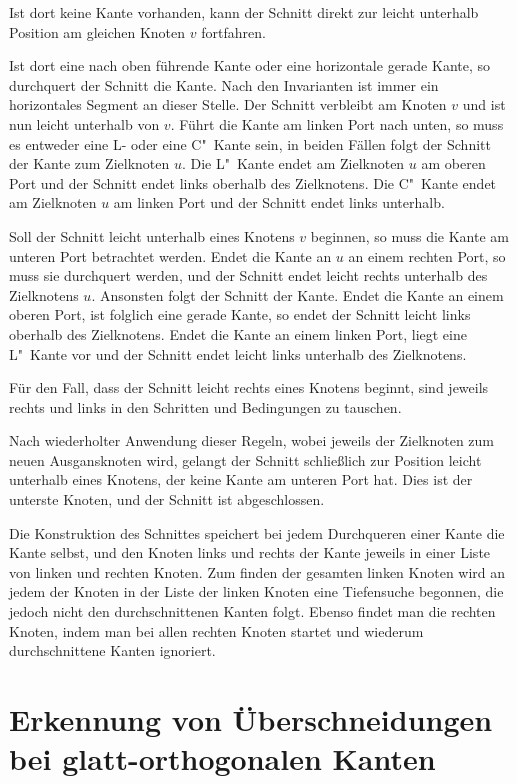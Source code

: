 \documentclass[a4paper]{scrreprt}
\theoremstyle{definition}
\begin{document}
Ist dort keine Kante vorhanden, kann der Schnitt direkt zur leicht unterhalb Position am gleichen Knoten $v$ fortfahren.

Ist dort eine nach oben führende Kante oder eine horizontale gerade Kante, so durchquert der Schnitt die Kante. Nach den Invarianten ist immer ein horizontales Segment an dieser Stelle. Der Schnitt verbleibt am Knoten $v$ und ist nun leicht unterhalb von $v$. Führt die Kante am linken Port nach unten, so muss es entweder eine L- oder eine C"~Kante sein, in beiden Fällen folgt der Schnitt der Kante zum Zielknoten $u$. Die L"~Kante endet am Zielknoten $u$ am oberen Port und der Schnitt endet links oberhalb des Zielknotens. Die C"~Kante endet am Zielknoten $u$ am linken Port und der Schnitt endet links unterhalb.

Soll der Schnitt leicht unterhalb eines Knotens $v$ beginnen, so muss die Kante am unteren Port betrachtet werden. Endet die Kante an $u$ an einem rechten Port, so muss sie durchquert werden, und der Schnitt endet leicht rechts unterhalb des Zielknotens $u$. Ansonsten folgt der Schnitt der Kante. Endet die Kante an einem oberen Port, ist folglich eine gerade Kante, so endet der Schnitt leicht links oberhalb des Zielknotens. Endet die Kante an einem linken Port, liegt eine L"~Kante vor und der Schnitt endet leicht links unterhalb des Zielknotens.

Für den Fall, dass der Schnitt leicht rechts eines Knotens beginnt, sind jeweils rechts und links in den Schritten und Bedingungen zu tauschen.

Nach wiederholter Anwendung dieser Regeln, wobei jeweils der Zielknoten zum neuen Ausgansknoten wird, gelangt der Schnitt schließlich zur Position leicht unterhalb eines Knotens, der keine Kante am unteren Port hat. Dies ist der unterste Knoten, und der Schnitt ist abgeschlossen.

Die Konstruktion des Schnittes speichert bei jedem Durchqueren einer Kante die Kante selbst, und den Knoten links und rechts der Kante jeweils in einer Liste von linken und rechten Knoten. Zum finden der gesamten linken Knoten wird an jedem der Knoten in der Liste der linken Knoten eine Tiefensuche begonnen, die jedoch nicht den durchschnittenen Kanten folgt. Ebenso findet man die rechten Knoten, indem man bei allen rechten Knoten startet und wiederum durchschnittene Kanten ignoriert.

\section{Erkennung von Überschneidungen bei glatt-orthogonalen Kanten}
\end{document}
